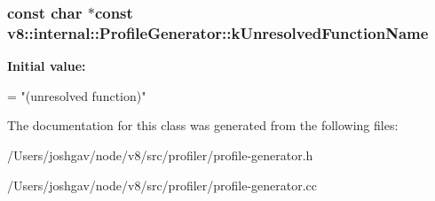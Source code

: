 \subsubsection[{\texorpdfstring{k\+Unresolved\+Function\+Name}{kUnresolvedFunctionName}}]{\setlength{\rightskip}{0pt plus 5cm}const char $\ast$const v8\+::internal\+::\+Profile\+Generator\+::k\+Unresolved\+Function\+Name\hspace{0.3cm}{\ttfamily [static]}}\hypertarget{classv8_1_1internal_1_1_profile_generator_a89aba0ecc28829cf41e8058109fe2037}{}\label{classv8_1_1internal_1_1_profile_generator_a89aba0ecc28829cf41e8058109fe2037}
{\bfseries Initial value\+:}
\begin{DoxyCode}
=
    \textcolor{stringliteral}{"(unresolved function)"}
\end{DoxyCode}


The documentation for this class was generated from the following files\+:\begin{DoxyCompactItemize}
\item 
/\+Users/joshgav/node/v8/src/profiler/profile-\/generator.\+h\item 
/\+Users/joshgav/node/v8/src/profiler/profile-\/generator.\+cc\end{DoxyCompactItemize}
